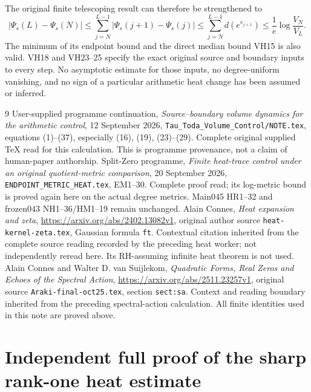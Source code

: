 \documentclass[11pt]{article}
\begin{document}
The original finite telescoping result can therefore be strengthened to
\begin{equation}\tag{VH31}\label{hvh:VH31}
|\Psi_s(L)-\Psi_s(N)|\le
\sum_{j=N}^{L-1}|\Psi_s(j+1)-\Psi_s(j)|
\le\sum_{j=N}^{L-1}d(e^{v_{j+1}})
\le\frac1e\log\frac{V_N}{V_L}.
\end{equation}
The minimum of its endpoint bound and the direct median bound VH15 is
also valid. VH18 and VH23--25 specify the exact original source and
boundary inputs to every step. No asymptotic estimate for those inputs,
no degree-uniform vanishing, and no sign of a particular arithmetic
heat change has been assumed or inferred.

\begin{thebibliography}{9}
 User-supplied programme continuation,
\emph{Source--boundary volume dynamics for the arithmetic control},
12 September 2026, \texttt{Tau\_Toda\_Volume\_Control/NOTE.tex},
equations (1)--(37), especially (16), (19), (23)--(29).
Complete original supplied TeX read for this calculation. This is
programme provenance, not a claim of human-paper authorship.
 Split-Zero programme,
\emph{Finite heat-trace control under an original quotient-metric comparison},
20 September 2026, \texttt{ENDPOINT\_METRIC\_HEAT.tex}, EM1--30.
Complete proof read; its log-metric bound is proved again here on the
actual degree metrics. Main045 HR1--32 and frozen043 NH1--36/HM1--19
remain unchanged.
 Alain Connes, \emph{Heat expansion and zeta},
\url{https://arxiv.org/abs/2402.13082v1}, original author source
\texttt{heat-kernel-zeta.tex}, Gaussian formula \texttt{ft}.
Contextual citation inherited from the complete source reading recorded
by the preceding heat worker; not independently reread here. Its
RH-assuming infinite heat theorem is not used.
 Alain Connes and Walter D. van Suijlekom,
\emph{Quadratic Forms, Real Zeros and Echoes of the Spectral Action},
\url{https://arxiv.org/abs/2511.23257v1}, original source
\texttt{Araki-final-oct25.tex}, section \texttt{sect:sa}.
Context and reading boundary inherited from the preceding spectral-action
calculation. All finite identities used in this note are proved above.
\end{thebibliography}

\endgroup

\clearpage\begingroup
\part*{Independent full proof of the sharp rank-one heat estimate}
\newtheorem{hrktheorem}{Theorem}
\newtheorem{hrklemma}{Lemma}
\newtheorem{hrkcorollary}{Corollary}
\newcommand{\hrktr}{\operatorname{tr}}
\newcommand{\hrkrank}{\operatorname{rank}}
\newcommand{\hrkran}{\operatorname{ran}}
\newcommand{\hrkdiag}{\operatorname{diag}}
\end{document}
